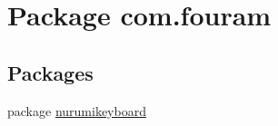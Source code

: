 \hypertarget{namespacecom_1_1fouram}{}\section{Package com.\+fouram}
\label{namespacecom_1_1fouram}
\subsection*{Packages}
\begin{DoxyCompactItemize}
\item 
package \hyperlink{namespacecom_1_1fouram_1_1nurumikeyboard}{nurumikeyboard}
\end{DoxyCompactItemize}
